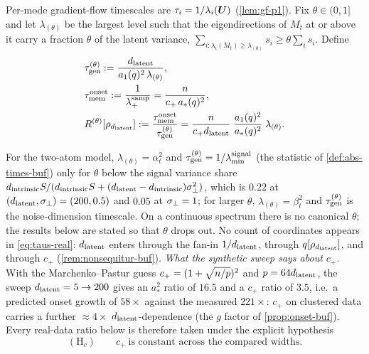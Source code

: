 \begin{definition}\label{def:ratio-real}
Per-mode gradient-flow timescales are $\tau_i=1/\lambda_i(\bm{U})$ (\cref{lem:gf-p1}). Fix $\theta\in(0,1]$ and let $\lambda_{(\theta)}$ be the largest level such that the eigendirections of $M_t$ at or above it carry a fraction $\theta$ of the latent variance, $\sum_{i:\lambda_i(M_t)\ge\lambda_{(\theta)}}s_i\ge\theta\sum_is_i$. Define
\begin{equation}\label{eq:taus-real}
\begin{aligned}
&\tau_{\mathrm{gen}}^{(\theta)}:=\frac{d_{\mathrm{latent}}}{a_1(q)^2\,\lambda_{(\theta)}},\\ &
\tau_{\mathrm{mem}}^{\mathrm{onset}}:=\frac1{\lambda_+^{\mathrm{samp}}}=\frac{n}{c_+\,a_\ast(q)^2},\\ &
R^{(\theta)}[\rho_{d_{\mathrm{latent}}}]:=\frac{\tau_{\mathrm{mem}}^{\mathrm{onset}}}{\tau_{\mathrm{gen}}^{(\theta)}}=\frac{n}{c_+d_{\mathrm{latent}}}\;\frac{a_1(q)^2}{a_\ast(q)^2}\;\lambda_{(\theta)} .
\end{aligned}
\end{equation}
\end{definition}
For the two-atom model, $\lambda_{(\theta)}=\alpha_t^2$ and $\tau_{\mathrm{gen}}^{(\theta)}=1/\lambda^{\mathrm{signal}}_{\min}$ (the statistic of \cref{def:abs-times-buf}) only for $\theta$ below the signal variance share $d_{\mathrm{intrinsic}} S/(d_{\mathrm{intrinsic}} S+(d_{\mathrm{latent}}-d_{\mathrm{intrinsic}})\sigma_{\perp}^2)$, which is $0.22$ at $(d_{\mathrm{latent}},\sigma_{\perp})=(200,0.5)$ and $0.05$ at $\sigma_{\perp}=1$; for larger $\theta$, $\lambda_{(\theta)}=\beta_t^2$ and $\tau_{\mathrm{gen}}^{(\theta)}$ is the noise-dimension timescale. On a continuous spectrum there is no canonical $\theta$; the results below are stated so that $\theta$ drops out. No count of coordinates appears in \eqref{eq:taus-real}: $d_{\mathrm{latent}}$ enters through the fan-in $1/d_{\mathrm{latent}}$, through $q[\rho_{d_{\mathrm{latent}}}]$, and through $c_+$ (\cref{rem:nonsequitur-buf}). \emph{What the synthetic sweep says about $c_+$.} With the Marchenko--Pastur guess $c_+=(1+\sqrt{n/p})^2$ and $p=64d_{\mathrm{latent}}$, the sweep $d_{\mathrm{latent}}=5\to200$ gives an $a_\ast^2$ ratio of $16.5$ and a $c_+$ ratio of $3.5$, i.e.\ a predicted onset growth of $58\times$ against the measured $221\times$: $c_+$ on clustered data carries a further $\approx4\times$ $d_{\mathrm{latent}}$-dependence (the $g$ factor of \cref{prop:onset-buf}). Every real-data ratio below is therefore taken under the explicit hypothesis
\begin{equation}\label{eq:Hc-real}
(\mathrm H_c)\qquad c_+\ \text{is constant across the compared widths.}
\end{equation}

